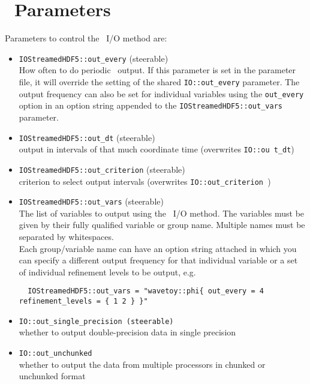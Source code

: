 \documentclass{article}
\begin{document}
\section{\ThisThorn\ Parameters}

Parameters to control the \ThisThorn\ I/O method are:
\begin{itemize}
  \item {\tt IOStreamedHDF5::out\_every} (steerable)\\
        How often to do periodic \ThisThorn\ output. If this parameter
        is set in the parameter file, it will override the setting of the shared
        {\tt IO::out\_every} parameter. The output frequency can also be set
        for individual variables using the {\tt out\_every} option in an option
        string appended to the {\tt IOStreamedHDF5::out\_vars} parameter.

  \item {\tt IOStreamedHDF5::out\_dt} (steerable)\\
        output in intervals of that much coordinate time (overwrites {\tt IO::ou
t\_dt})

  \item {\tt IOStreamedHDF5::out\_criterion} (steerable)\\
        criterion to select output intervals (overwrites {\tt IO::out\_criterion
})

  \item {\tt IOStreamedHDF5::out\_vars} (steerable)\\
        The list of variables to output using the \ThisThorn\ I/O method.
        The variables must be given by their fully qualified variable or group
        name. Multiple names must be separated by whitespaces.\\

        Each group/variable name can have an option string attached in which you
        can specify a different output frequency for that individual variable
        or a set of individual refinement levels to be output, e.g.
\begin{verbatim}
  IOStreamedHDF5::out_vars = "wavetoy::phi{ out_every = 4 refinement_levels = { 1 2 } }"
\end{verbatim}

  \item {\tt IO::out\_single\_precision (steerable)}\\
        whether to output double-precision data in single precision

  \item {\tt IO::out\_unchunked}\\
        whether to output the data from multiple processors in chunked or
        unchunked format


\end{itemize}
\end{document}
